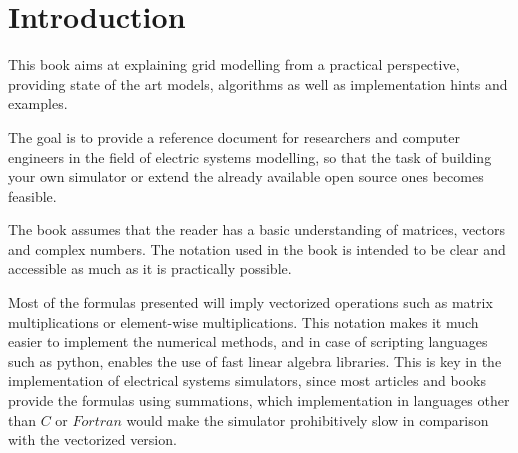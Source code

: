 \documentclass[nols,a4paper,twoside,symmetric,notoc,fleqn]{tufte-book}
\newcommand{\monthyear}{%
  \ifcase\month\or January\or February\or March\or April\or May\or June\or
  July\or August\or September\or October\or November\or
  December\fi\space\number\year
}
\begin{document}
\newpage
%
%
%
%



\tableofcontents

\listoffigures

\listoftables


\mainmatter
\chapter{Introduction}

This book aims at explaining grid modelling from a practical perspective, providing state of the art models, algorithms as well as implementation hints and examples.

The goal is to provide a reference document for researchers and computer engineers in the field of electric systems modelling, so that the task of building your own simulator or extend the already available open source ones becomes feasible.

The book assumes that the reader has a basic understanding of matrices, vectors and complex numbers. The notation used in the book is intended to be clear and accessible as much as it is practically possible.

Most of the formulas presented will imply vectorized operations such as matrix multiplications or element-wise multiplications. This notation makes it much easier to implement the numerical methods, and in case of scripting languages such as python, enables the use of fast linear algebra libraries. This is key in the implementation of electrical systems simulators, since most articles and books provide the formulas using summations, which implementation in languages other than $C$ or $Fortran$ would make the simulator prohibitively slow in comparison with the vectorized version.
\end{document}
